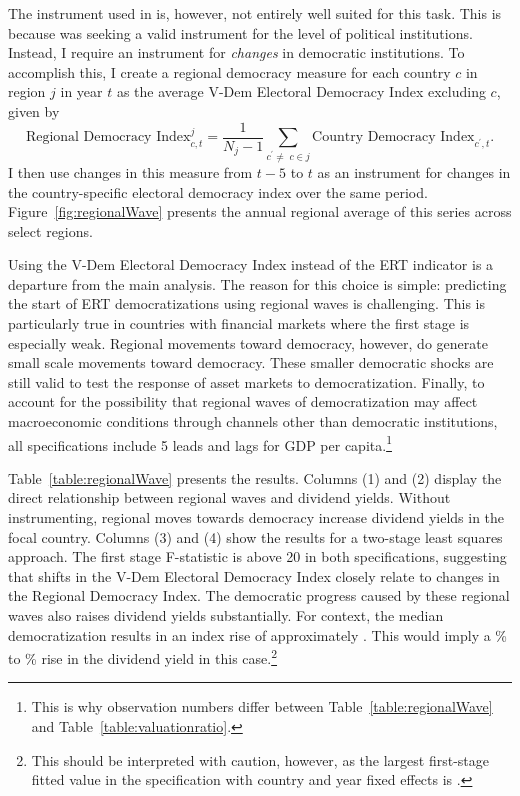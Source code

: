 

The instrument used in \cite{Acemoglu2019} is, however, not entirely well suited for this task. This is because \citeauthor{Acemoglu2019} was seeking a valid instrument for the level of political institutions. Instead, I require an instrument for {\it changes} in democratic institutions. To accomplish this, I create a regional democracy measure for each country $c$ in region $j$ in year $t$ as the average V-Dem Electoral Democracy Index excluding $c$, given by
\begin{equation}
\text{Regional Democracy Index}^j_{c,t} = \frac{1}{N_j-1}\sum_{c^\prime \neq \;c\in j}  \text{Country Democracy Index}_{c^\prime, t}.
\label{eq:reg_dem}
\end{equation}
I then use changes in this measure from $t-5$ to $t$ as an instrument for changes in the country-specific electoral democracy index over the same period. Figure~\ref{fig:regionalWave} presents the annual regional average of this series across select regions.

Using the V-Dem Electoral Democracy Index instead of the ERT indicator is a departure from the main analysis. The reason for this choice is simple: predicting the start of ERT democratizations using regional waves is challenging. This is particularly true in countries with financial markets where the first stage is especially weak. Regional movements toward democracy, however, do generate small scale movements toward democracy.  These smaller democratic shocks are still valid to test the response of asset markets to democratization. Finally, to account for the possibility that regional waves of democratization may affect macroeconomic conditions through channels other than democratic institutions, all specifications include 5 leads and lags for GDP per capita.\footnote{This is why observation numbers differ between Table~\ref{table:regionalWave} and Table~\ref{table:valuationratio}.}

Table~\ref{table:regionalWave} presents the results. Columns (1) and (2) display the direct relationship between regional waves and dividend yields. Without instrumenting, regional moves towards democracy increase dividend yields in the focal country. Columns (3) and (4) show the results for a two-stage least squares approach. The first stage F-statistic is above 20 in both specifications, suggesting that shifts in the V-Dem Electoral Democracy Index closely relate to changes in the Regional Democracy Index. The democratic progress caused by these regional waves also raises dividend yields substantially. For context, the median democratization results in an index rise of approximately \medianDemIndexChange. This would imply a \tabFiveIVLow\% to \tabFiveIVHigh\% rise in the dividend yield in this case.\footnote{This should be interpreted with caution, however, as the largest first-stage fitted value in the specification with country and year fixed effects is \tabFiveMaxFittedValue.}

